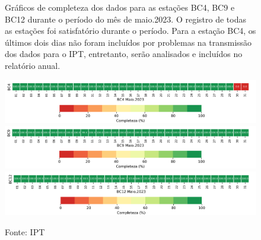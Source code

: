 
\begin{figure}[hp]
    \centering
	\captionsetup{justification=justified, singlelinecheck=false, width=1\textwidth}
    \caption{Gráficos de completeza dos dados para as estações BC4, BC9 e BC12 durante o período do mês de maio.2023. O registro de todas as estações foi satisfatório durante o período. Para a estação BC4, os últimos dois dias não foram incluídos por problemas na transmissão dos dados para o IPT, entretanto, serão analisados e incluídos no relatório anual. }
    \includegraphics[width=1.0\textwidth]{./boletim/baesa/figuras/bc4_completude.png}
    \includegraphics[width=1.0\textwidth]{./boletim/baesa/figuras/bc9_completude.png}
    \includegraphics[width=1.0\textwidth]{./boletim/baesa/figuras/bc12_completude.png}
    \caption*{Fonte: IPT}
\end{figure}
